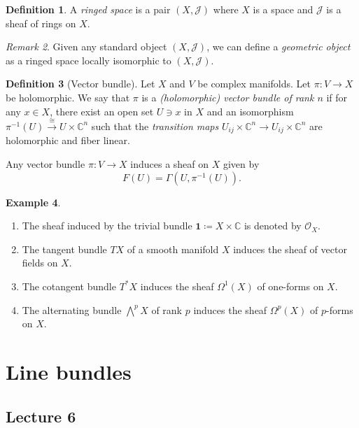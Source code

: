 \documentclass[10pt,letterpaper,cm]{nupset}
\theoremstyle{definition}
\newtheorem{defn}{Definition}[subsection]
\newtheorem{exmp}[defn]{Example}
\theoremstyle{theorem}
\theoremstyle{remark}
\newtheorem{remark}[defn]{Remark}
\newcommand{\C}{\mathbb C}
\newcommand{\J}{\mathcal J}
\renewcommand{\O}{\mathcal O}
\newcommand{\1}{\mathbb{1}}
\newcommand{\0}{\vec 0}
\newcommand{\be}{\begin{enumerate}}
\newcommand{\ee}{\end{enumerate}}
\begin{document}
\smallskip

\begin{defn}
A \textit{ringed space} is a pair $\left(X, \J\right)$ where $X$ is a space and $\J$ is a sheaf of rings on $X$.
\end{defn}

\begin{remark} Given any standard object $\left(X, \J\right)$, we can define a \textit{geometric object} as a ringed space locally isomorphic to $\left(X, \J\right)$.
\end{remark}

\medskip

\begin{defn}[Vector bundle]
Let $X$ and $V$ be complex manifolds. Let $\pi : V \to X$ be holomorphic. We say that $\pi$ is a \textit{(holomorphic) vector bundle of rank $n$} if for any $x\in X$, there exist an open set $U\ni x$ in $X$ and an isomorphism $\pi^{-1}(U) \overset{\cong}{\longrightarrow} U \times \C^n$ such that the \textit{transition maps} $U_{ij} \times \C^n \to U_{ij} \times \C^n$ are holomorphic and fiber linear.
\end{defn}

\smallskip

Any vector bundle $\pi : V \to X$ induces a sheaf on $X$ given by
\[
F(U) = \Gamma\left(U, \pi^{-1}(U)\right).
\]

\begin{exmp} $ $
\be
\item The sheaf induced by the trivial bundle $\mathbf{1} \coloneqq X \times \C$ is denoted by $\O_X$.
\item The tangent bundle $T{X}$ of a smooth manifold $X$ induces the sheaf of vector fields on $X$.
\item The cotangent bundle $T^{\ast}{X}$ induces the sheaf $\Omega^1(X)$ of one-forms on $X$.
\item The alternating bundle $\bigwedge^p{X}$ of rank $p$ induces the sheaf $\Omega^p(X)$ of $p$-forms on $X$.
\ee
\end{exmp}

\section{Line bundles}

\subsection{Lecture 6}
\end{document}

